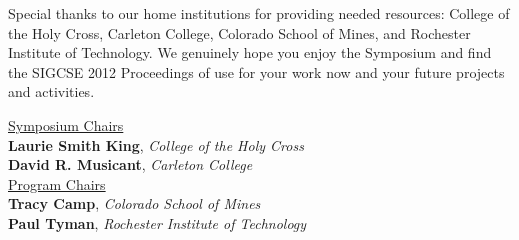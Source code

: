 Special thanks to our home institutions for providing needed resources: College of the Holy Cross, Carleton College, Colorado School of Mines, and Rochester Institute of Technology. We genuinely hope you enjoy the Symposium and find the SIGCSE 2012 Proceedings of use for your work now and your future projects and activities.

{\raggedleft
\underline{Symposium Chairs} \\
\vspace{0.5\baselineskip}
\textbf{Laurie Smith King}, \textit{College of the Holy Cross} \\
\textbf{David R. Musicant}, \textit{Carleton College} \\
\vspace{1em}
\underline{Program Chairs} \\
\vspace{0.5\baselineskip}
\textbf{Tracy Camp}, \textit{Colorado School of Mines} \\
\textbf{Paul Tyman}, \textit{Rochester Institute of Technology} 


}
\newpage
